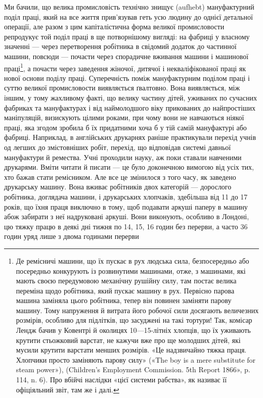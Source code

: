Ми бачили, що велика промисловість технічно знищує (aufhebt)
мануфактурний поділ праці, який на все життя прив’язував
геть усю людину до однієї детальної операції, але разом з цим
капіталістична форма великої промисловости репродукує той
поділ праці в ще потворнішому вигляді: на фабриці у власному
значенні — через перетворення робітника в свідомий додаток
до частинної машини, повсюди — почасти через спорадичне вживання
машини і машинової праці\footnote{
Де ремісничі машини, що їх пускає в рух людська сила, безпосередньо
або посередньо конкурують із розвинутими машинами, отже, з
машинами, які мають своєю передумовою механічну рушійну силу, там
постає велика переміна щодо робітника, який пускає машину в рух.
Первісно парова машина заміняла цього робітника, тепер він повинен
заміняти парову машину. Тому напруження й витрата його робочої сили
досягають величезних розмірів, особливо для підлітків, що засуджені
на такі тортури! Так, комісар Лендж бачив у Ковентрі й околицях 10—15-літніх
хлопців, що їх уживають крутити стьожковий варстат, не
кажучи вже про ще молодших дітей, які мусили крутити варстати менших
розмірів. «Це надзвичайно тяжка праця. Хлопчики просто заміняють
парову силу» («The boy is a mere substitute for steam power»),
(Children’s Employment Commission. 5th Report 1866», p. 114, n. 6). Про
вбійчі наслідки «цієї системи рабства», як називає її офіціяльний звіт,
там же і далі.
}, а почасти через заведення
жіночої, дитячої і некваліфікованої праці як нової основи поділу
праці. Суперечність поміж мануфактурним поділом праці і суттю
великої промисловости виявляється ґвалтовно. Вона виявляється,
між іншим, у тому жахливому факті, що велику частину дітей,
уживаних по сучасних фабриках та мануфактурах і від наймолодшого
віку прикованих до найпростіших маніпуляцій, визискують
цілими роками, при чому вони не навчаються ніякої праці, яка
згодом зробила б їх придатними хоча б у тій самій мануфактурі
або фабриці. Наприклад, в англійських друкарнях раніше практикували
перехід учнів од легших до змістовніших робіт, перехід,
що відповідав системі давньої мануфактури й ремества. Учні
проходили науку, аж поки ставали навченими друкарями. Вміти
читати й писати — це було доконечною вимогою від усіх тих,
хто бажав стати ремісником. Але все це змінилося з того часу,
як заведено друкарську машину. Вона вживає робітників двох
категорій — дорослого робітника, доглядача машини, і друкарських
хлопчаків, здебільша від 11 до 17 років, що їхня праця
виключно в тому, щоб подавати аркуші паперу в машину абож
забирати з неї надруковані аркуші. Вони виконують, особливо
в Лондоні, цю тяжку працю в деякі дні тижня по 14, 15, 16 годин
без перерви, а часто 36 годин уряд лише з двома годинами перерви
\parbreak{}  %
